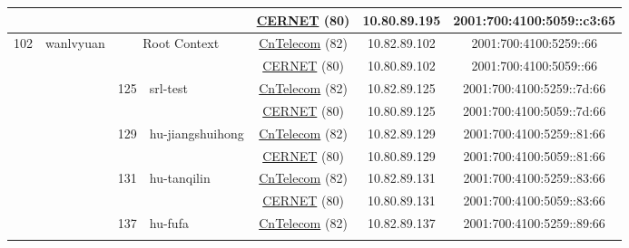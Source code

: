 \begin{small}
\begin{center}
\begin{longtable}{|c|c|c|c|c|c|c|c|}
  &  &  &  & \multicolumn{2}{|c|}{\tiny{\href{http://www.cernet.edu.cn}{CERNET} (80)}} & \tiny{10.80.89.195} & \tiny{2001:700:4100:5059::c3:65} \\ \hline
 \multirow{26}{*}{\tiny{102}} & \multicolumn{1}{|l|}{\multirow{26}{*}{\tiny{wanlvyuan}}} & \multicolumn{2}{|c|}{\multirow{2}{*}{\tiny{Root Context}}} & \multicolumn{2}{|c|}{\tiny{\href{http://www.chinatelecom.com.cn}{CnTelecom} (82)}} & \tiny{10.82.89.102} & \tiny{2001:700:4100:5259::66} \\* \cline{5-5}\cline{6-6}\cline{7-7}\cline{8-8}
  &  & \multicolumn{2}{|c|}{} & \multicolumn{2}{|c|}{\tiny{\href{http://www.cernet.edu.cn}{CERNET} (80)}} & \tiny{10.80.89.102} & \tiny{2001:700:4100:5059::66} \\* \cline{3-3}\cline{4-4}\cline{5-5}\cline{6-6}\cline{7-7}\cline{8-8}
  &  & \multirow{2}{*}{\tiny{125}} & \multicolumn{1}{|l|}{\multirow{2}{*}{\tiny{srl-test}}} & \multicolumn{2}{|c|}{\tiny{\href{http://www.chinatelecom.com.cn}{CnTelecom} (82)}} & \tiny{10.82.89.125} & \tiny{2001:700:4100:5259::7d:66} \\* \cline{5-5}\cline{6-6}\cline{7-7}\cline{8-8}
  &  &  &  & \multicolumn{2}{|c|}{\tiny{\href{http://www.cernet.edu.cn}{CERNET} (80)}} & \tiny{10.80.89.125} & \tiny{2001:700:4100:5059::7d:66} \\* \cline{3-3}\cline{4-4}\cline{5-5}\cline{6-6}\cline{7-7}\cline{8-8}
  &  & \multirow{2}{*}{\tiny{129}} & \multicolumn{1}{|l|}{\multirow{2}{*}{\tiny{hu-jiangshuihong}}} & \multicolumn{2}{|c|}{\tiny{\href{http://www.chinatelecom.com.cn}{CnTelecom} (82)}} & \tiny{10.82.89.129} & \tiny{2001:700:4100:5259::81:66} \\* \cline{5-5}\cline{6-6}\cline{7-7}\cline{8-8}
  &  &  &  & \multicolumn{2}{|c|}{\tiny{\href{http://www.cernet.edu.cn}{CERNET} (80)}} & \tiny{10.80.89.129} & \tiny{2001:700:4100:5059::81:66} \\* \cline{3-3}\cline{4-4}\cline{5-5}\cline{6-6}\cline{7-7}\cline{8-8}
  &  & \multirow{2}{*}{\tiny{131}} & \multicolumn{1}{|l|}{\multirow{2}{*}{\tiny{hu-tanqilin}}} & \multicolumn{2}{|c|}{\tiny{\href{http://www.chinatelecom.com.cn}{CnTelecom} (82)}} & \tiny{10.82.89.131} & \tiny{2001:700:4100:5259::83:66} \\* \cline{5-5}\cline{6-6}\cline{7-7}\cline{8-8}
  &  &  &  & \multicolumn{2}{|c|}{\tiny{\href{http://www.cernet.edu.cn}{CERNET} (80)}} & \tiny{10.80.89.131} & \tiny{2001:700:4100:5059::83:66} \\* \cline{3-3}\cline{4-4}\cline{5-5}\cline{6-6}\cline{7-7}\cline{8-8}
  &  & \multirow{2}{*}{\tiny{137}} & \multicolumn{1}{|l|}{\multirow{2}{*}{\tiny{hu-fufa}}} & \multicolumn{2}{|c|}{\tiny{\href{http://www.chinatelecom.com.cn}{CnTelecom} (82)}} & \tiny{10.82.89.137} & \tiny{2001:700:4100:5259::89:66} \\* \cline{5-5}\cline{6-6}\cline{7-7}\cline{8-8}

\end{longtable}
\end{center}
\end{small}
